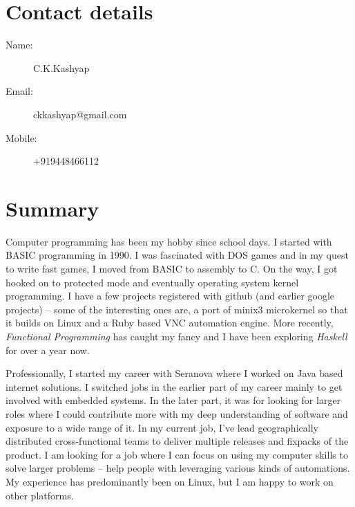 \documentclass [a4paper,11pt] {article}
\begin{document}
\section*{Contact details}
\begin{description}
\item[Name:] C.K.Kashyap
\item[Email:] ckkashyap@gmail.com
\item[Mobile:] +919448466112
\end{description}

\section*{Summary}
Computer programming has been my hobby since school days. I started with BASIC
programming in 1990. I was fascinated with DOS games and in my quest to write
fast games, I moved from BASIC to assembly to C. On the way, I got hooked on to
protected mode and eventually operating system kernel programming. I have a few
projects registered with github (and earlier google projects) –  some of the
interesting ones are, a port of minix3 microkernel so that it builds on Linux
and a Ruby based VNC automation engine. More recently, {\it Functional Programming}
has caught my fancy and I have been exploring {\it Haskell} for over a year now.

Professionally, I started my career with Seranova where I worked on Java based
internet solutions. I switched jobs in the earlier part of my career mainly to
get involved with embedded systems.  In the later part, it was for looking for
larger roles where I could contribute more with my deep understanding of
software and exposure to a wide range of it.  In my current job, I’ve lead
geographically distributed cross-functional teams to deliver multiple releases
and fixpacks of the product. I am looking for a job where I can focus on using
my computer skills to solve larger problems – help people with leveraging
various kinds of automations. My experience has predominantly been on Linux,
but I am happy to work on other platforms.
\end{document}
